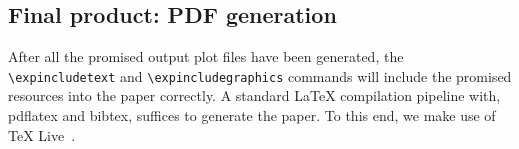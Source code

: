 
\subsection{Final product: PDF generation}

After all the promised output plot files have been generated, the \texttt{\textbackslash expincludetext} and \texttt{\textbackslash expincludegraphics} commands will include the promised resources into the paper correctly. A standard \LaTeX{} compilation pipeline with, \eg pdflatex and bibtex, suffices to generate the paper. To this end, we make use of TeX Live~\cite{texlive}.
